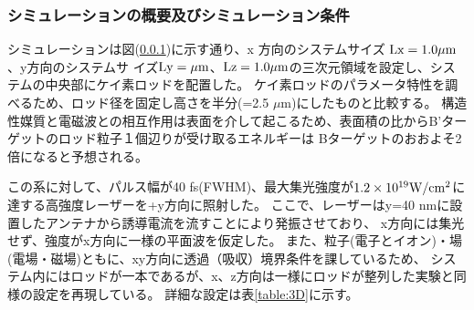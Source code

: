 \documentclass[a4paper,11pt,titlepage]{jsarticle}
\begin{document}
    \subsubsection{シミュレーションの概要及びシミュレーション条件}
    シミュレーションは図(\ref{})に示す通り、x 方向のシステムサイズ $\rm{Lx = 1.0 \mu m}$、y方向のシステムサ
    イズ$\rm{Ly = \mu m}$、$\rm{Lz = 1.0 \mu m}$の三次元領域を設定し、システムの中央部にケイ素ロッドを配置した。
    ケイ素ロッドのパラメータ特性を調べるため、ロッド径を固定し高さを半分(=2.5 $\mu$m)にしたものと比較する。
    構造性媒質と電磁波との相互作用は表面を介して起こるため、表面積の比からB'ターゲットのロッド粒子１個辺りが受け取るエネルギーは
    Bターゲットのおおよそ2倍になると予想される。

    この系に対して、パルス幅が40 fs(FWHM)、最大集光強度が$1.2 \times 10^{19} \rm W/cm^2$に達する高強度レーザーを+y方向に照射した。
    ここで、レーザーはy=40 nmに設置したアンテナから誘導電流を流すことにより発振させており、
    x方向には集光せず、強度がx方向に一様の平面波を仮定した。
    また、粒子(電子とイオン)・場(電場・磁場)ともに、xy方向に透過（吸収）境界条件を課しているため、
    システム内にはロッドが一本であるが、x、z方向は一様にロッドが整列した実験と同様の設定を再現している。
    詳細な設定は表\ref{table:3D}に示す。
\end{document}
